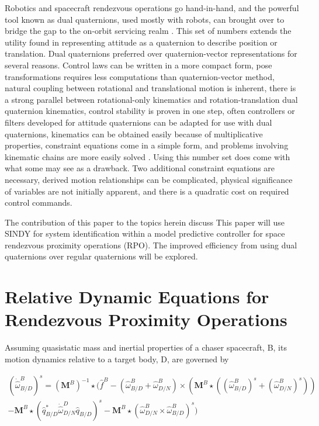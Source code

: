 \documentclass[letterpaper, preprint, paper,11pt]{AAS}	%
\begin{document}
Robotics and spacecraft rendezvous operations go hand-in-hand, and the powerful tool known as dual quaternions, used mostly with robots, can brought over to bridge the gap to the on-orbit servicing realm \cite{valverde_tsiotras_spacecraftrobot}. This set of numbers extends the utility found in representing attitude as a quaternion to describe position or translation. Dual quaternions preferred over quaternion-vector representations for several reasons. Control laws can be written in a more compact form, pose transformations requires less computations than quaternion-vector method, natural coupling between rotational and translational motion is inherent, there is a strong parallel between rotational-only kinematics and rotation-translation dual quaternion kinematics, control stability is proven in one step, often controllers or filters developed for attitude quaternions can be adapted for use with dual quaternions, kinematics can be obtained easily because of multiplicative properties, constraint equations come in a simple form, and problems involving kinematic chains are more easily solved \cite{filipe_tsiotras_dualQ,tsiotras_valverde_DualQuatAsTool,dooley_mccarthy_spatialrigidbody}. Using this number set does come with what some may see as a drawback. Two additional constraint equations are necessary, derived motion relationships can be complicated, physical significance of variables are not initially apparent, and there is a quadratic cost on required control commands. \cite{dooley_mccarthy_spatialrigidbody,lee_mesbahi,constrainedautonomousprecision}


The contribution of this paper to the topics herein discuss
This paper will use SINDY for system identification within a model predictive controller for space rendezvous proximity operations (RPO). The improved efficiency from using dual quaternions over regular quaternions will be explored. 

\section{Relative Dynamic Equations for Rendezvous Proximity Operations}
Assuming quasistatic mass and inertial properties of a chaser spacecraft, B, its motion dynamics relative to a target body, D, are governed by

\begin{equation}
\begin{aligned}
	\label{eq:dyn}
	(\dot{\hat{\omega}}^B_{B/D})^s = (\textbf{M}^B)^{-1}\star(\hat{f}^B-(\hat{\omega}^B_{B/D}+\hat{\omega}^B_{D/N})\times(\textbf{M}^B\star((\hat{\omega}^B_{B/D})^s+(\hat{\omega}^B_{D/N})^s))\\-\textbf{M}^B\star(\hat{q}^*_{B/D}\dot{\hat{\omega}}^D_{D/N}\hat{q}_{B/D})^s-\textbf{M}^B\star(\hat{\omega}^B_{D/N}\times\hat{\omega}^B_{B/D})^s)
\end{aligned}
\end{equation}
\end{document}
